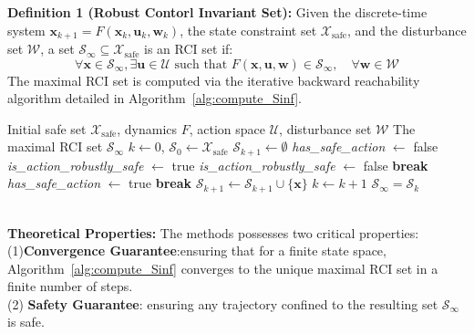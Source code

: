 \documentclass[conference]{IEEEtran}
\begin{document}
\textbf{Definition 1 (Robust Contorl Invariant Set):} Given the discrete-time system $\mathbf{x}_{k+1} = F(\mathbf{x}_k, \mathbf{u}_k, \mathbf{w}_k)$, the state constraint set $\mathcal{X}_{\text{safe}}$, and the disturbance set $\mathcal{W}$, a set $\mathcal{S}_\infty \subseteq \mathcal{X}_{\text{safe}}$ is an RCI set if:
\begin{equation}
\forall \mathbf{x} \in \mathcal{S}_\infty, \exists \mathbf{u} \in \mathcal{U} \text{ such that } F(\mathbf{x}, \mathbf{u}, \mathbf{w}) \in \mathcal{S}_\infty, \quad \forall \mathbf{w} \in \mathcal{W}
\label{eq:RCI_definition}
\end{equation}
The maximal RCI set is computed via the iterative backward reachability algorithm detailed in Algorithm~\ref{alg:compute_Sinf}.
\begin{algorithm}[h]
    \caption{Computation of the Maximal RCI Set ($\mathcal{S}_\infty$)}
    \label{alg:compute_Sinf}
    \begin{algorithmic}[1]
        \Require Initial safe set $\mathcal{X}_{\text{safe}}$, dynamics $F$, action space $\mathcal{U}$, disturbance set $\mathcal{W}$
        \Ensure The maximal RCI set $\mathcal{S}_\infty$
        \State $k \gets 0$, \;$\mathcal{S}_{0} \gets \mathcal{X}_{\text{safe}}$
        \Repeat
            \State $\mathcal{S}_{k+1} \gets \emptyset$
                \State \textit{has\_safe\_action} $\gets$ false
                    \State \textit{is\_action\_robustly\_safe} $\gets$ true
                            \State \textit{is\_action\_robustly\_safe} $\gets$ false
                            \State \textbf{break} 
                        \EndIf
                    \EndFor
                        \State \textit{has\_safe\_action} $\gets$ true
                        \State \textbf{break} 
                    \EndIf
                \EndFor
                    \State $\mathcal{S}_{k+1} \gets \mathcal{S}_{k+1} \cup \{\mathbf{x}\}$
                \EndIf
            \EndFor
            \State $k \gets k + 1$
        \State \Return $\mathcal{S}_\infty = \mathcal{S}_{k}$
    \end{algorithmic}
\end{algorithm}
\\
\textbf{Theoretical Properties:} The methods  possesses two critical properties: \\
(1)\textbf{Convergence Guarantee}:ensuring that for a finite state space, Algorithm~\ref{alg:compute_Sinf} converges to the unique maximal RCI set in a finite number of steps. \\
(2) \textbf{Safety Guarantee}: ensuring any trajectory confined to the resulting set $\mathcal{S}_\infty$ is safe.\\
\end{document}
